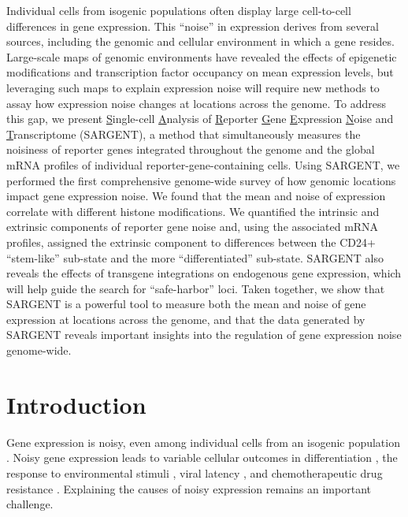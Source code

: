 Individual cells from isogenic populations often display large cell-to-cell differences in gene expression. This \enquote{noise} in expression derives from several sources, including the genomic and cellular environment in which a gene resides. Large-scale maps of genomic environments have revealed the effects of epigenetic modifications and transcription factor occupancy on mean expression levels, but leveraging such maps to explain expression noise will require new methods to assay how expression noise changes at locations across the genome. To address this gap, we present \underline{S}ingle-cell \underline{A}nalysis of \underline{R}eporter \underline{G}ene \underline{E}xpression \underline{N}oise and \underline{T}ranscriptome (SARGENT), a method that simultaneously measures the noisiness of reporter genes integrated throughout the genome and the global mRNA profiles of individual reporter-gene-containing cells. Using SARGENT, we performed the first comprehensive genome-wide survey of how genomic locations impact gene expression noise. We found that the mean and noise of expression correlate with different histone modifications. We quantified the intrinsic and extrinsic components of reporter gene noise and, using the associated mRNA profiles, assigned the extrinsic component to differences between the CD24+ \enquote{stem-like} sub-state and the more \enquote{differentiated} sub-state. SARGENT also reveals the effects of transgene integrations on endogenous gene expression, which will help guide the search for \enquote{safe-harbor} loci. Taken together, we show that SARGENT is a powerful tool to measure both the mean and noise of gene expression at locations across the genome, and that the data generated by SARGENT reveals important insights into the regulation of gene expression noise genome-wide. 

\section{Introduction}

Gene expression is noisy, even among individual cells from an isogenic population \cite{raja_vanoudenaardena:NatureNurture2008}. Noisy gene expression leads to variable cellular outcomes in differentiation \cite{changhh_huangs:TranscriptomewideNoise2008,kalmart_ariasam:RegulatedFluctuations2009,abranchese_henriqued:StochasticNANOG2014,desairv_weinbergerls:DNARepair2021}, the response to environmental stimuli \cite{spencersl_sorgerpk:NongeneticOrigins2009, topolewskip_komorowskim:PhenotypicVariability2022}, viral latency \cite{weinbergerls_schafferdv:StochasticGene2005}, and chemotherapeutic drug resistance \cite{shaffersm_raja:RareCell2017, emertbl_raja:VariabilityRare2021, yangc_spencersl:MelanomaSubpopulations2021}. Explaining the causes of noisy expression remains an important challenge. 

